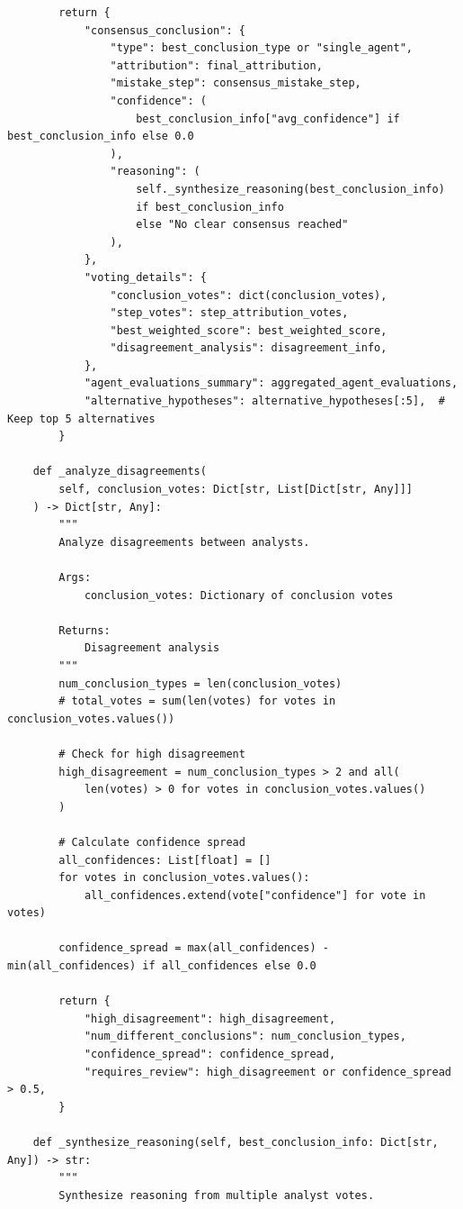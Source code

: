 \documentclass{article}
\begin{document}
\begin{lstlisting}
        return {
            "consensus_conclusion": {
                "type": best_conclusion_type or "single_agent",
                "attribution": final_attribution,
                "mistake_step": consensus_mistake_step,
                "confidence": (
                    best_conclusion_info["avg_confidence"] if best_conclusion_info else 0.0
                ),
                "reasoning": (
                    self._synthesize_reasoning(best_conclusion_info)
                    if best_conclusion_info
                    else "No clear consensus reached"
                ),
            },
            "voting_details": {
                "conclusion_votes": dict(conclusion_votes),
                "step_votes": step_attribution_votes,
                "best_weighted_score": best_weighted_score,
                "disagreement_analysis": disagreement_info,
            },
            "agent_evaluations_summary": aggregated_agent_evaluations,
            "alternative_hypotheses": alternative_hypotheses[:5],  # Keep top 5 alternatives
        }

    def _analyze_disagreements(
        self, conclusion_votes: Dict[str, List[Dict[str, Any]]]
    ) -> Dict[str, Any]:
        """
        Analyze disagreements between analysts.

        Args:
            conclusion_votes: Dictionary of conclusion votes

        Returns:
            Disagreement analysis
        """
        num_conclusion_types = len(conclusion_votes)
        # total_votes = sum(len(votes) for votes in conclusion_votes.values())

        # Check for high disagreement
        high_disagreement = num_conclusion_types > 2 and all(
            len(votes) > 0 for votes in conclusion_votes.values()
        )

        # Calculate confidence spread
        all_confidences: List[float] = []
        for votes in conclusion_votes.values():
            all_confidences.extend(vote["confidence"] for vote in votes)

        confidence_spread = max(all_confidences) - min(all_confidences) if all_confidences else 0.0

        return {
            "high_disagreement": high_disagreement,
            "num_different_conclusions": num_conclusion_types,
            "confidence_spread": confidence_spread,
            "requires_review": high_disagreement or confidence_spread > 0.5,
        }

    def _synthesize_reasoning(self, best_conclusion_info: Dict[str, Any]) -> str:
        """
        Synthesize reasoning from multiple analyst votes.


\end{lstlisting}
\end{document}

